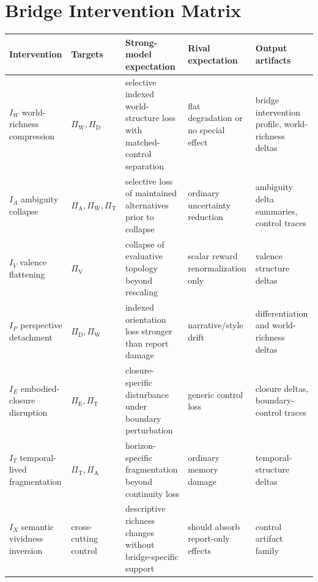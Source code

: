 \documentclass[11pt,a4paper]{article}
\theoremstyle{definition}
\newcommand{\PiD}{\Pi_{\mathrm{D}}}
\newcommand{\PiV}{\Pi_{\mathrm{V}}}
\newcommand{\PiW}{\Pi_{\mathrm{W}}}
\newcommand{\PiA}{\Pi_{\mathrm{A}}}
\newcommand{\PiE}{\Pi_{\mathrm{E}}}
\newcommand{\PiT}{\Pi_{\mathrm{T}}}
\begin{document}
\section{Bridge Intervention Matrix}
\begin{center}
\small
\begin{tabularx}{\linewidth}{@{}>{\raggedright\arraybackslash}p{}>{\raggedright\arraybackslash}p{}>{\raggedright\arraybackslash}p{}>{\raggedright\arraybackslash}p{}>{\raggedright\arraybackslash}p{}@{}}
\toprule
Intervention & Targets & Strong-model expectation & Rival expectation & Output artifacts \\
\midrule
$I_W$ world-richness compression & $\PiW,\allowbreak \PiD$ & selective indexed world-structure loss with matched-control separation & flat degradation or no special effect & bridge intervention profile, world-richness deltas \\
$I_A$ ambiguity collapse & $\PiA,\allowbreak \PiW,\allowbreak \PiT$ & selective loss of maintained alternatives prior to collapse & ordinary uncertainty reduction & ambiguity delta summaries, control traces \\
$I_V$ valence flattening & $\PiV$ & collapse of evaluative topology beyond rescaling & scalar reward renormalization only & valence structure deltas \\
$I_P$ perspective detachment & $\PiD,\allowbreak \PiW$ & indexed orientation loss stronger than report damage & narrative/style drift & differentiation and world-richness deltas \\
$I_E$ embodied-closure disruption & $\PiE,\allowbreak \PiT$ & closure-specific disturbance under boundary perturbation & generic control loss & closure deltas, boundary-control traces \\
$I_T$ temporal-lived fragmentation & $\PiT,\allowbreak \PiA$ & horizon-specific fragmentation beyond continuity loss & ordinary memory damage & temporal-structure deltas \\
$I_X$ semantic vividness inversion & cross-cutting control & descriptive richness changes without bridge-specific support & should absorb report-only effects & control artifact family \\
\bottomrule
\end{tabularx}
\end{center}
\end{document}
